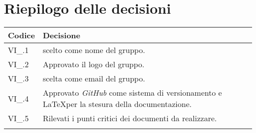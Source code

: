 \section{Riepilogo delle decisioni \hfil}
{
	\setlength{\freewidth}{\dimexpr\textwidth-4\tabcolsep}
	\renewcommand{\arraystretch}{1.5}
	\setlength{\aboverulesep}{0pt}
	\setlength{\belowrulesep}{0pt}
	\begin{longtable}{L{.3\freewidth} L{.7\freewidth}}
		\toprule 
		\textbf{Codice} & \textbf{Decisione}\\
		\toprule
		\endhead
		
		VI\_\DataMeeting{}.1 & \textit{\Gruppo{}} scelto come nome del gruppo. \\  
		VI\_\DataMeeting{}.2 & Approvato il logo del gruppo. \\ 
		VI\_\DataMeeting{}.3 & \textit{\Mail{}} scelta come email del gruppo. \\
		VI\_\DataMeeting{}.4 & Approvato \textit{GitHub} come sistema di versionamento e \LaTeX per la stesura della documentazione. \\  
		VI\_\DataMeeting{}.5 & Rilevati i punti critici dei documenti da realizzare. \\
		
		
		\bottomrule
		\hiderowcolors
	\end{longtable}
}
